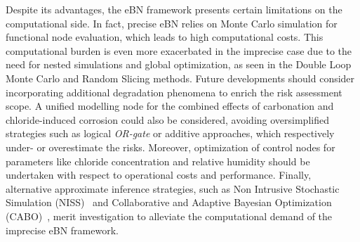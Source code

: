 Despite its advantages, the eBN framework presents certain limitations on the computational side. In fact, precise eBN relies on Monte Carlo simulation for functional node evaluation, which leads to high computational costs. This computational burden is even more exacerbated in the imprecise case due to the need for nested simulations and global optimization, as seen in the Double Loop Monte Carlo and Random Slicing methods.
Future developments should consider incorporating additional degradation phenomena to enrich the risk assessment scope. A unified modelling node for the combined effects of carbonation and chloride-induced corrosion could also be considered, avoiding oversimplified strategies such as logical \textit{OR-gate} or additive approaches, which respectively under- or overestimate the risks. Moreover, optimization of control nodes for parameters like chloride concentration and relative humidity should be undertaken with respect to operational costs and performance. Finally, alternative approximate inference strategies, such as Non Intrusive Stochastic Simulation (NISS)~\cite{wei_non-intrusive_2019} and Collaborative and Adaptive Bayesian Optimization (CABO)~\cite{hong_sequential_2024}, merit investigation to alleviate the computational demand of the imprecise eBN framework.